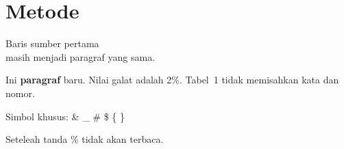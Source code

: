 \section{Metode}
    Baris sumber pertama\\
    masih menjadi paragraf yang sama.
    
    Ini \textbf{paragraf} baru. Nilai galat adalah 2\%.
    Tabel~1 tidak memisahkan kata dan nomor.
    
    Simbol khusus: \& \_ \# \$ \{ \}
    
    
    Seteleah tanda \% tidak akan terbaca. %